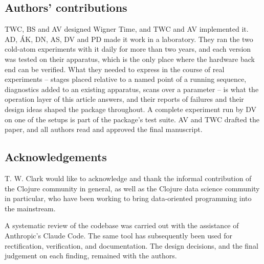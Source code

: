 \documentclass{SciPost}
\begin{document}
\subsection*{Authors’ contributions}
TWC, BS and AV designed Wigner Time, and TWC and AV implemented it. AD, ÁK, DN, AS, DV and PD made it work in a laboratory. They ran the two cold-atom experiments with it daily for more than two years, and each version was tested on their apparatus, which is the only place where the hardware back end can be verified. What they needed to express in the course of real experiments – stages placed relative to a named point of a running sequence, diagnostics added to an existing apparatus, scans over a parameter – is what the operation layer of this article answers, and their reports of failures and their design ideas shaped the package throughout. A complete experiment run by DV on one of the setups is part of the package’s test suite. AV and TWC drafted the paper, and all authors read and approved the final manuscript.

\subsection*{Acknowledgements}
T. W. Clark would like to acknowledge and thank the informal contribution of the Clojure community in general, as well as the Clojure data science community in particular, who have been working to bring data-oriented programming into the mainstream.

A systematic review of the codebase was carried out with the assistance of Anthropic’s Claude Code. The same tool has subsequently been used for rectification, verification, and documentation. The design decisions, and the final judgement on each finding, remained with the authors.
 
\end{document}
